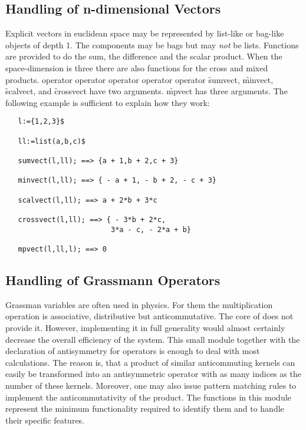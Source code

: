 \subsection{Handling of n-dimensional Vectors}
Explicit vectors in  euclidean space may be represented by
list-like or bag-like objects of depth 1.
The components may be bags but may \emph{not} be lists.
Functions are provided to do the sum, the difference and the
scalar product. When the space-dimension is three there are also functions
for the cross and mixed products.
 {operator}
 {operator}
 {operator}
 {operator}
 {operator}
\hypertarget{operator:SUMVECT}{}
\hypertarget{operator:MINVECT}{}
\hypertarget{operator:SCALVECT}{}
\hypertarget{operator:CROSSVECT}{}
\hypertarget{operator:MPVECT}{}
\f{sumvect}, \f{minvect}, \f{scalvect}, and \f{crossvect} have two arguments.
\f{mpvect} has three arguments. The following example
is sufficient to explain how they work:
\begin{verbatim}
   l:={1,2,3}$

   ll:=list(a,b,c)$

   sumvect(l,ll); ==> {a + 1,b + 2,c + 3}

   minvect(l,ll); ==> { - a + 1, - b + 2, - c + 3}

   scalvect(l,ll); ==> a + 2*b + 3*c

   crossvect(l,ll); ==> { - 3*b + 2*c,
                         3*a - c, - 2*a + b}

   mpvect(l,ll,l); ==> 0
\end{verbatim}
\subsection{Handling of Grassmann Operators}
Grassman variables are often used in physics. For them the multiplication
operation is associative, distributive but anticommutative. The
core of \REDUCE does not provide it. However, implementing
it in full generality would almost
certainly decrease the overall efficiency of the system. This small
module together with the declaration of antisymmetry for operators is
enough to deal with most calculations. The reason is, that a
product of similar anticommuting kernels can easily  be transformed
into an antisymmetric operator with as many indices as the number of
these kernels. Moreover, one may also issue pattern matching rules
to implement the anticommutativity of the product.
The functions in this module represent the minimum functionality
required to identify them and to handle their specific features.

